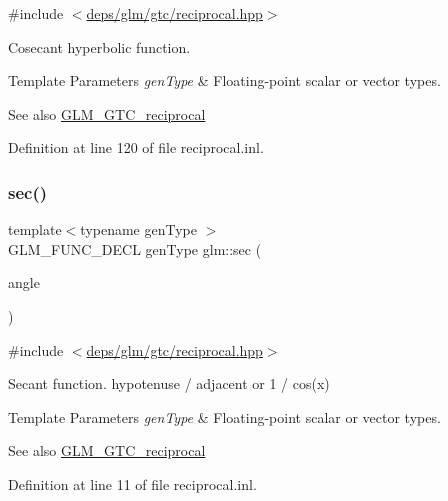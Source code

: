 {\ttfamily \#include $<$\hyperlink{reciprocal_8hpp}{deps/glm/gtc/reciprocal.\+hpp}$>$}

Cosecant hyperbolic function.


\begin{DoxyTemplParams}{Template Parameters}
{\em gen\+Type} & Floating-\/point scalar or vector types.\\
\hline
\end{DoxyTemplParams}
\begin{DoxySeeAlso}{See also}
\hyperlink{group__gtc__reciprocal}{G\+L\+M\+\_\+\+G\+T\+C\+\_\+reciprocal} 
\end{DoxySeeAlso}


Definition at line 120 of file reciprocal.\+inl.

\mbox{\label{group__gtc__reciprocal_gae4bcbebee670c5ea155f0777b3acbd84}} 
\subsubsection{\texorpdfstring{sec()}{sec()}}
{\footnotesize\ttfamily template$<$typename gen\+Type $>$ \\
G\+L\+M\+\_\+\+F\+U\+N\+C\+\_\+\+D\+E\+CL gen\+Type glm\+::sec (\begin{DoxyParamCaption}\item[{gen\+Type}]{angle }\end{DoxyParamCaption})}



{\ttfamily \#include $<$\hyperlink{reciprocal_8hpp}{deps/glm/gtc/reciprocal.\+hpp}$>$}

Secant function. hypotenuse / adjacent or 1 / cos(x)


\begin{DoxyTemplParams}{Template Parameters}
{\em gen\+Type} & Floating-\/point scalar or vector types.\\
\hline
\end{DoxyTemplParams}
\begin{DoxySeeAlso}{See also}
\hyperlink{group__gtc__reciprocal}{G\+L\+M\+\_\+\+G\+T\+C\+\_\+reciprocal} 
\end{DoxySeeAlso}


Definition at line 11 of file reciprocal.\+inl.

\mbox{\label{group__gtc__reciprocal_ga9a5cfd1e7170104a7b33863b1b75e5ae}} 
